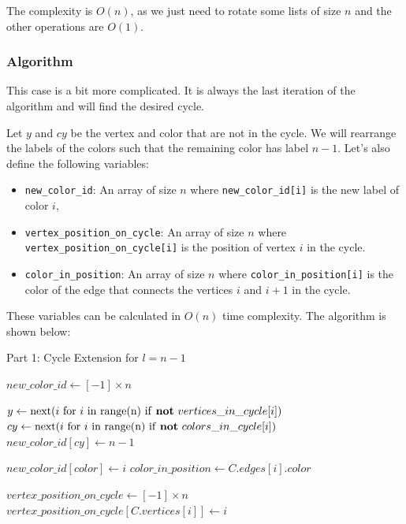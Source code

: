 \begin{itemize}
    The complexity is $O(n)$, as we just need to rotate some lists of size $n$ and the other operations are $O(1)$.
\end{itemize}

\subsubsection{Algorithm}

This case is a bit more complicated. It is always the last iteration of the algorithm and will
find the desired cycle.

Let $y$ and $cy$ be the vertex and color that are not in the cycle. We will rearrange the labels
of the colors such that the remaining color has label $n - 1$. Let's also define the following variables:

\begin{itemize}
    \item \texttt{new\_color\_id}: An array of size \( n \) where \texttt{new\_color\_id[i]} is the new label of color \( i \),
    \item \texttt{vertex\_position\_on\_cycle}: An array of size \( n \) where \texttt{vertex\_position\_on\_cycle[i]} is the position of vertex \( i \) in the cycle.
    \item \texttt{color\_in\_position}: An array of size \( n \) where \texttt{color\_in\_position[i]} is the color of the edge that connects the vertices \( i \) and \( i + 1 \) in the cycle.
\end{itemize}

These variables can be calculated in \( O(n) \) time complexity. The algorithm is shown below:

\begin{algorithm}
    \caption{Part 1: Cycle Extension for \( l = n - 1 \)}
    \begin{algorithmic}
            \State $new\_color\_id \gets [-1] \times n$

            \State $y \gets \text{next}(i \text{ for } i \text{ in range(n) if \textbf{not} } vertices\_in\_cycle[i])$
            \State $cy \gets \text{next}(i \text{ for } i \text{ in range(n) if \textbf{not} } colors\_in\_cycle[i])$
            \State $new\_color\_id[cy] \gets n - 1$
            
                \State $new\_color\_id[color] \gets i$
                \State $color\_in\_position \gets C.edges[i].color$
            \EndFor
            
            \State $vertex\_position\_on\_cycle \gets [-1] \times n$
                \State $vertex\_position\_on\_cycle[C.vertices[i]] \gets i$
            \EndFor
        \EndFunction
    \end{algorithmic}
\end{algorithm}

